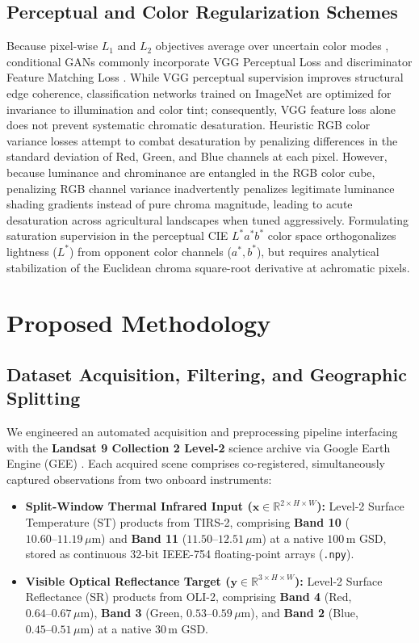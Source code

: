 \documentclass[10pt,a4paper,twoside]{article}
\begin{document}
\subsection{Perceptual and Color Regularization Schemes}
Because pixel-wise $L_1$ and $L_2$ objectives average over uncertain color modes \cite{ref7}, conditional GANs commonly incorporate VGG Perceptual Loss \cite{ref19, ref20} and discriminator Feature Matching Loss \cite{ref8}. While VGG perceptual supervision improves structural edge coherence, classification networks trained on ImageNet are optimized for invariance to illumination and color tint; consequently, VGG feature loss alone does not prevent systematic chromatic desaturation. Heuristic RGB color variance losses attempt to combat desaturation by penalizing differences in the standard deviation of Red, Green, and Blue channels at each pixel. However, because luminance and chrominance are entangled in the RGB color cube, penalizing RGB channel variance inadvertently penalizes legitimate luminance shading gradients instead of pure chroma magnitude, leading to acute desaturation across agricultural landscapes when tuned aggressively. Formulating saturation supervision in the perceptual CIE $L^*a^*b^*$ color space orthogonalizes lightness ($L^*$) from opponent color channels ($a^*, b^*$), but requires analytical stabilization of the Euclidean chroma square-root derivative at achromatic pixels.

\section{Proposed Methodology}

\subsection{Dataset Acquisition, Filtering, and Geographic Splitting}
We engineered an automated acquisition and preprocessing pipeline interfacing with the \textbf{Landsat 9 Collection 2 Level-2} science archive via Google Earth Engine (GEE) \cite{ref2, ref21}. Each acquired scene comprises co-registered, simultaneously captured observations from two onboard instruments:
\begin{itemize}
    \item \textbf{Split-Window Thermal Infrared Input ($\mathbf{x} \in \mathbb{R}^{2 \times H \times W}$):} Level-2 Surface Temperature (ST) products from TIRS-2, comprising \textbf{Band 10} ($10.60\text{--}11.19\,\mu\text{m}$) and \textbf{Band 11} ($11.50\text{--}12.51\,\mu\text{m}$) at a native $100\,\text{m}$ GSD, stored as continuous 32-bit IEEE-754 floating-point arrays (\texttt{.npy}).
    \item \textbf{Visible Optical Reflectance Target ($\mathbf{y} \in \mathbb{R}^{3 \times H \times W}$):} Level-2 Surface Reflectance (SR) products from OLI-2, comprising \textbf{Band 4} (Red, $0.64\text{--}0.67\,\mu\text{m}$), \textbf{Band 3} (Green, $0.53\text{--}0.59\,\mu\text{m}$), and \textbf{Band 2} (Blue, $0.45\text{--}0.51\,\mu\text{m}$) at a native $30\,\text{m}$ GSD.
\end{itemize}
\end{document}
